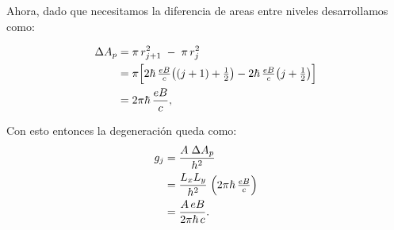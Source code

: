 \documentclass{report}
\begin{document}
Ahora, dado que necesitamos la diferencia de areas entre niveles desarrollamos como:


\begin{align*}
\Delta A_p &= \pi\,r_{j+1}^2 \;-\;\pi\,r_j^2\\
&= \pi\Bigl[2\hbar\,\tfrac{eB}{c}\bigl((j+1)+\tfrac12\bigr)
     -2\hbar\,\tfrac{eB}{c}\bigl(j+\tfrac12\bigr)\Bigr]\\
&= 2\pi\hbar\,\frac{eB}{c},
\end{align*}

Con esto entonces la degeneración queda como:
\begin{align*}
g_j &= \frac{A\;\Delta A_p}{h^2}\\
  &= \frac{L_xL_y}{h^2}\;\Bigl(2\pi\hbar\,\tfrac{eB}{c}\Bigr)\\
&= \frac{A\,eB}{2\pi\hbar\,c}.
\end{align*}

\section{}
\end{document}
